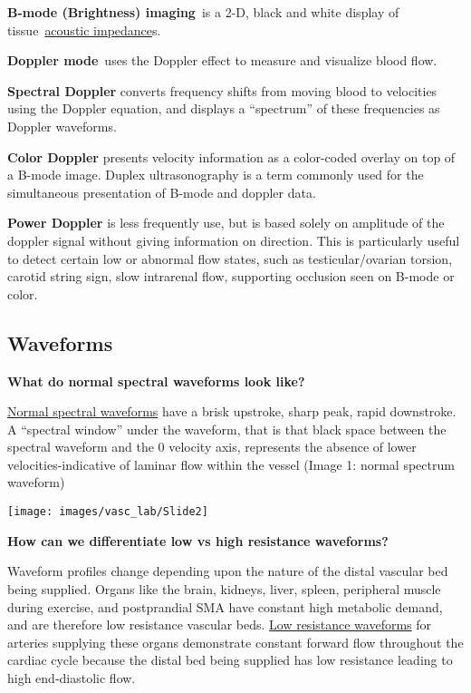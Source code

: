 \documentclass[
]{book}
\begin{document}
\textbf{B-mode (Brightness) imaging}~is a 2-D, black and white display of
tissue~\href{https://en.wikipedia.org/wiki/Acoustic_impedance}{acoustic
impedance}s.

\textbf{Doppler mode}~uses the Doppler effect to measure and visualize blood
flow.

\textbf{Spectral Doppler} converts frequency shifts from moving blood to
velocities using the Doppler equation, and displays a ``spectrum'' of
these frequencies as Doppler waveforms.

\textbf{Color Doppler} presents velocity information as a color-coded overlay
on top of a B-mode image. Duplex ultrasonography is a term commonly used
for the simultaneous presentation of B-mode and doppler data.

\textbf{Power Doppler} is less frequently use, but is based solely on
amplitude of the doppler signal without giving information on direction.
This is particularly useful to detect certain low or abnormal flow
states, such as testicular/ovarian torsion, carotid string sign, slow
intrarenal flow, supporting occlusion seen on B-mode or
color.\citep{pellerito2019}

\hypertarget{waveforms}{%
\subsection{Waveforms}\label{waveforms}}

\textbf{What do normal spectral waveforms look like?}

\uline{Normal spectral waveforms} have a brisk upstroke, sharp
peak, rapid downstroke. A ``spectral window'' under the waveform, that is
that black space between the spectral waveform and the 0 velocity axis,
represents the absence of lower velocities-indicative of laminar flow
within the vessel (Image 1: normal spectrum waveform)

\texttt{[image: images/vasc\_lab/Slide2]}

\textbf{How can we differentiate low vs high resistance waveforms?}

Waveform profiles change depending upon the nature of the distal
vascular bed being supplied. Organs like the brain, kidneys, liver,
spleen, peripheral muscle during exercise, and postprandial SMA have
constant high metabolic demand, and are therefore low resistance
vascular beds. \uline{Low resistance waveforms} for arteries
supplying these organs demonstrate constant forward flow throughout the
cardiac cycle because the distal bed being supplied has low resistance
leading to high end-diastolic flow.
\end{document}
